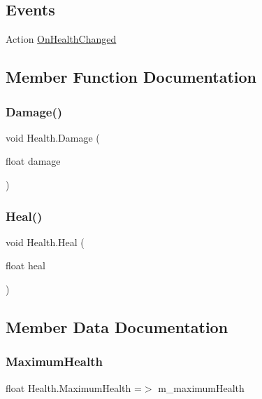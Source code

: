\subsection*{Events}
\begin{DoxyCompactItemize}
\item 
Action \mbox{\hyperlink{class_health_a49e530e913ac9ee7bb470c45e514e8c4}{On\+Health\+Changed}}
\end{DoxyCompactItemize}


\subsection{Member Function Documentation}
\mbox{\label{class_health_a564fd67be57689e737a7415a423293f4}} 
\subsubsection{\texorpdfstring{Damage()}{Damage()}}
{\footnotesize\ttfamily void Health.\+Damage (\begin{DoxyParamCaption}\item[{float}]{damage }\end{DoxyParamCaption})}

\mbox{\label{class_health_a6cfe21665a630cf40a67fdd56c4a9a60}} 
\subsubsection{\texorpdfstring{Heal()}{Heal()}}
{\footnotesize\ttfamily void Health.\+Heal (\begin{DoxyParamCaption}\item[{float}]{heal }\end{DoxyParamCaption})}



\subsection{Member Data Documentation}
\mbox{\label{class_health_a7aca7e37f7b84aaa4f815b7f9a8457ee}} 
\subsubsection{\texorpdfstring{Maximum\+Health}{MaximumHealth}}
{\footnotesize\ttfamily float Health.\+Maximum\+Health =$>$ m\+\_\+maximum\+Health}



